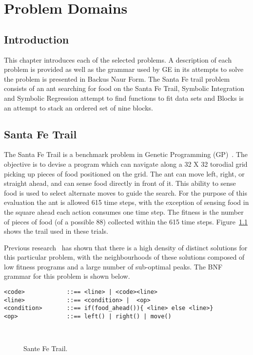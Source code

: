 \chapter{Problem Domains}
\section{Introduction}
This chapter introduces each of the selected problems. A description of each problem is provided as well as  the grammar used by GE in its attempts to solve the problem is presented in Backus Naur Form. The Santa Fe trail problem consists of an ant searching for food on the Santa Fe Trail, Symbolic Integration and Symbolic Regression attempt to find functions to fit data sets and Blocks is an attempt to stack an ordered set of nine blocks.

\section{Santa Fe Trail}
The Santa Fe Trail is a benchmark problem in Genetic Programming (GP)~\cite{koza}. The objective is to devise a program which can navigate along a 32 X 32 torodial grid picking up pieces of food positioned on the grid. The ant can move left, right, or straight ahead, and can sense food directly in front of it. This ability to sense food is used to select alternate moves to guide the search. For the purpose of this evaluation the ant is allowed 615 time steps, with the exception of sensing food in the square ahead each action consumes one time step. The fitness is the number of pieces of food  (of a possible 88) collected within the 615 time steps. Figure~\ref{trail} shows the trail used in these trials.

Previous research~\cite{langdon} has shown that there is a high density of distinct solutions for this particular problem, with the neighbourhoods of these solutions composed of low fitness programs and a large number of sub-optimal peaks. 
The BNF grammar for this problem is shown below.

\small
\begin{verbatim}
<code>            ::== <line> | <code><line>
<line>            ::== <condition> |  <op> 
<condition>       ::== if(food_ahead()){ <line> else <line>}
<op>              ::== left() | right() | move()
\end{verbatim}
\normalsize



\begin{figure}[]
\centerline{\hbox{
}}
\caption{\label{trail} Sante Fe Trail.}
\end{figure}



